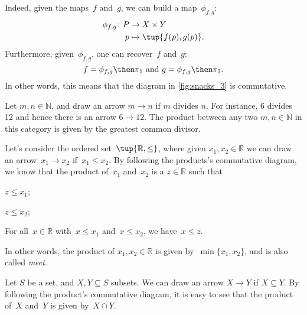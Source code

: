 \begin{example}
Indeed, given the maps~$f$ and~$g$, we can build a map~$\phi_{f,g}$:
\begin{equation*}
    \begin{aligned}
    \phi_{f,g}\colon P&\to X\times Y\\
    p&\mapsto \tup{f(p),g(p)}.
    \end{aligned}
\end{equation*}
Furthermore, given~$\phi_{f,g}$, one can recover~$f$ and~$g$:
\begin{equation*}
    f=\phi_{f,g}\then \pi_1 \text{ and }g=\phi_{f,g}\then \pi_2.
\end{equation*}
In other words, this means that the diagram in \cref{fig:snacks_3} is commutative.
\end{example}

\begin{example}
Let $m,n\in \mathbb{N}$, and draw an arrow $m\to n$ if $m$ divides $n$. For instance, 6 divides 12 and hence there is an arrow $6\to 12$. The product between any two $m,n\in \mathbb{N}$ in this category is given by the greatest common divisor. 
\end{example}

\begin{example}
Let's consider the ordered set~$\tup{\mathbb{R},\leq}$, where given $x_1,x_2\in \mathbb{R}$ we can draw an arrow~$x_1\to x_2$ if~$x_1\leq x_2$. By following the products's commutative diagram, we know that the product of~$x_1$ and~$x_2$ is a $z\in \mathbb{R}$ such that
\begin{compactitem}
\item $z\leq x_1$;
\item $z\leq x_2$;
\item For all~$x\in \mathbb{R}$ with~$x\leq x_1$ and~$x\leq x_2$, we have~$x\leq z$.
\end{compactitem}
In other words, the product of $x_1,x_2\in \mathbb{R}$ is given by~$\min\{x_1,x_2\}$, and is also called \emph{meet}.
\end{example}

\begin{example}
Let $S$ be a set, and $X,Y\subseteq S$ subsets. We can draw an arrow $X\to Y$ if $X\subseteq Y$. By following the product's commutative diagram, it is easy to see that the product of~$X$ and~$Y$ is given by~$X\cap Y$.
\end{example}

